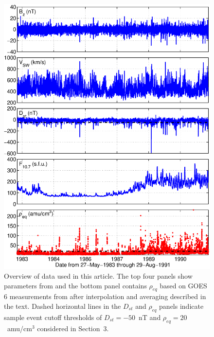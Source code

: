 \documentclass[12pt]{article}
\begin{document}
\begin{figure}[htp!]
\centering
\includegraphics[scale=0.45]{UsedFigures/2016SW001507R-p01.eps}
\caption{Overview of data used in this article. The top four panels show parameters from \cite{Kondrashov2014ReconstructionOfGaps} and the bottom panel contains $\rho_{eq}$ based on GOES 6 measurements from \cite{Denton} after interpolation and averaging described in the text. Dashed horizontal lines in the $D_{st}$ and $\rho_{eq}$ panels indicate sample event cutoff thresholds of $D_{st} = -50$~nT and $\rho_{eq} = 20$~amu/cm$^3$ considered in Section~3.}
\label{fig:AllData}
\end{figure}

\clearpage
\end{document}
